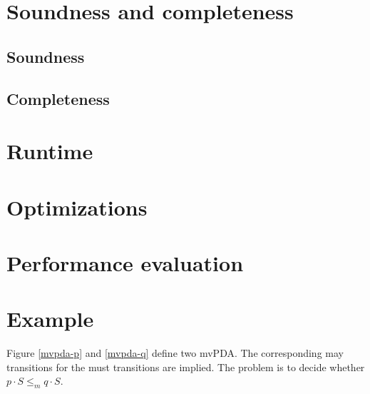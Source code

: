 \section{Soundness and completeness}

\subsection{Soundness}
\subsection{Completeness}

\section{Runtime}


\section{Optimizations}





\section{Performance evaluation}

\section{Example}

Figure \ref{mvpda-p} and \ref{mvpda-q} define two mvPDA. The corresponding may transitions for the must transitions are implied.
The problem is to decide whether $p⋅S ≤_m q⋅S$.

